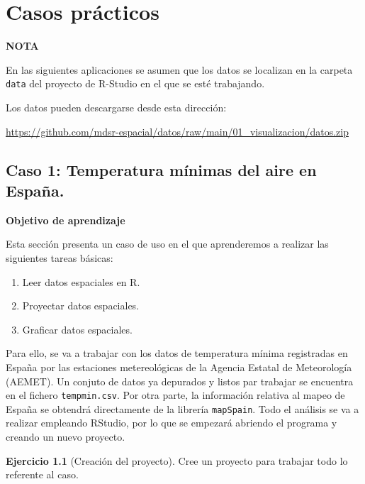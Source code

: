 \documentclass[
]{report}
\theoremstyle{definition}
\theoremstyle{definition}
\theoremstyle{definition}
\newtheorem{exercise}{Ejercicio}[chapter]
\theoremstyle{definition}
\theoremstyle{remark}
\begin{document}
\hypertarget{caos}{%
\chapter{Casos prácticos}\label{caos}}

\begin{infobox}
\textbf{NOTA}

En las siguientes aplicaciones se asumen que los datos se localizan en la
carpeta \texttt{data} del proyecto de R-Studio en el que se esté trabajando.

Los datos pueden descargarse desde esta dirección:

\url{https://github.com/mdsr-espacial/datos/raw/main/01_visualizacion/datos.zip}

\end{infobox}

\hypertarget{caso-1-temperatura-muxednimas-del-aire-en-espauxf1a.}{%
\section{Caso 1: Temperatura mínimas del aire en España.}\label{caso-1-temperatura-muxednimas-del-aire-en-espauxf1a.}}

\textbf{Objetivo de aprendizaje}

Esta sección presenta un caso de uso en el que aprenderemos a realizar las
siguientes tareas básicas:

\begin{enumerate}
\def\labelenumi{\arabic{enumi}.}
\item
  Leer datos espaciales en R.
\item
  Proyectar datos espaciales.
\item
  Graficar datos espaciales.
\end{enumerate}

Para ello, se va a trabajar con los datos de temperatura mínima registradas en
España por las estaciones metereológicas de la Agencia Estatal de Meteorología
(AEMET). Un conjuto de datos ya depurados y listos par trabajar se encuentra en
el fichero \texttt{tempmin.csv}. Por otra parte, la información relativa al mapeo de
España se obtendrá directamente de la librería \texttt{mapSpain}. Todo el análisis se
va a realizar empleando RStudio, por lo que se empezará abriendo el programa y
creando un nuevo proyecto.

\begin{exercise}[Creación del proyecto]
\protect\hypertarget{exr:ex-crea}{}\label{exr:ex-crea}Cree un proyecto para trabajar todo lo referente al caso.
\end{exercise}
\end{document}
